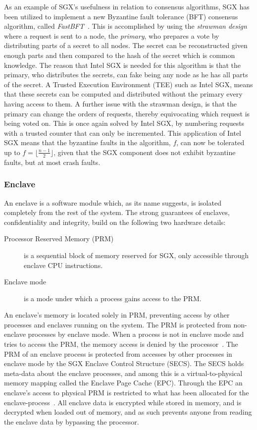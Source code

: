 \documentclass{article}
\begin{document}
		As an example of SGX's usefulness in relation to consensus algorithms, SGX has been utilized to implement a new Byzantine fault tolerance (BFT) consensus algorithm, called \textit{FastBFT}~\cite{liu_scalable_2016}.
		This is accomplished by using the \textit{strawman design} where a request is sent to a node, the \textit{primary}, who prepares a vote by distributing parts of a secret to all nodes.
		The secret can be reconstructed given enough parts and then compared to the hash of the secret which is common knowledge.
		The reason that Intel SGX is needed for this algorithm is that the primary, who distributes the secrets, can fake being any node as he has all parts of the secret.
		A Trusted Execution Environment (TEE) such as Intel SGX, means that these secrets can be computed and distributed without the primary every having access to them.
		A further issue with the strawman design, is that the primary can change the orders of requests, thereby equivocating which request is being voted on.
		This is once again solved by Intel SGX, by numbering requests with a trusted counter that can only be incremented.
		This application of Intel SGX means that the byzantine faults in the algorithm, $f$, can now be tolerated up to $f = \lfloor\frac{n-1}{2}\rfloor$, given that the SGX component does not exhibit byzantine faults, but at most crash faults.

			\subsubsection{Enclave}
			\label{subsec:enclave}

			An enclave is a software module which, as its name suggests, is isolated completely from the rest of the system.
			The strong guarantees of enclaves, confidentiality and integrity, build on the following two hardware details:
			\begin{description}
				\item [Processor Reserved Memory (PRM)] is a sequential block of memory reserved for SGX, only accessible through enclave CPU instructions.
				\item [Enclave mode] is a mode under which a process gains access to the PRM.
			\end{description}
			An enclave's memory is located solely in PRM, preventing access by other processes and enclaves running on the system.
			The PRM is protected from non-enclave processes by enclave mode.
			When a process is not in enclave mode and tries to access the PRM, the memory access is denied by the processor~\cite{costan_intel_2016}.
			The PRM of an enclave process is protected from accesses by other processes in enclave mode by the SGX Enclave Control Structure (SECS).
			The SECS holds meta-data about the enclave processes, and among this is a virtual-to-physical memory mapping called the Enclave Page Cache (EPC).
			Through the EPC an enclave's access to physical PRM is restricted to what has been allocated for the enclave-process~\cite{costan_intel_2016}.
			All enclave data is encrypted while stored in memory, and is decrypted when loaded out of memory, and as such prevents anyone from reading the enclave data by bypassing the processor.
\end{document}
